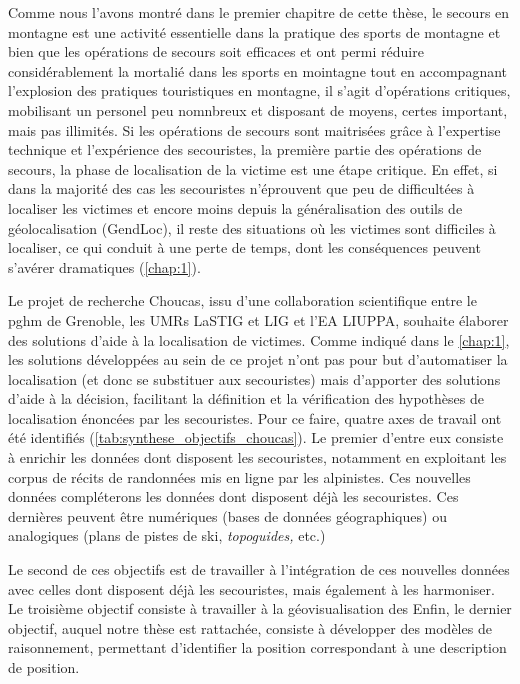 Comme nous l'avons montré dans le premier chapitre de cette thèse, le
secours en montagne est une activité essentielle dans la pratique des
sports de montagne et bien que les opérations de secours soit
efficaces et ont permi réduire considérablement la mortalié dans les
sports en mointagne tout en accompagnant l'explosion des pratiques
touristiques en montagne, il s'agit d'opérations critiques, mobilisant
un personel peu nomnbreux et disposant de moyens, certes important,
mais pas illimités. Si les opérations de secours sont maitrisées grâce
à l'expertise technique et l'expérience des secouristes,
%
la première partie des opérations de secours, \ie la phase de
localisation de la victime est une étape critique. En effet, si dans
la majorité des cas les secouristes n'éprouvent que peu de
difficultées à localiser les victimes et encore moins depuis la
généralisation des outils de géolocalisation (\eg GendLoc), il reste
des situations où les victimes sont difficiles à localiser, ce qui
conduit à une perte de temps, dont les conséquences peuvent s'avérer
dramatiques (\autoref{chap:1}).

Le projet de recherche Choucas, issu d'une collaboration scientifique
entre le \ac{pghm} de Grenoble, les UMRs LaSTIG et LIG et l'EA LIUPPA,
souhaite élaborer des solutions d'aide à la localisation de
victimes. Comme indiqué dans le \autoref{chap:1}, les solutions
développées au sein de ce projet n'ont pas pour but d'automatiser la
localisation (et donc se substituer aux secouristes) mais d'apporter
des solutions d'aide à la décision, facilitant la définition et la
vérification des hypothèses de localisation énoncées par les
secouristes. Pour ce faire, quatre axes de travail ont été identifiés
(\autoref{tab:synthese_objectifs_choucas}). Le premier d'entre eux
consiste à enrichir les données dont disposent les secouristes,
notamment en exploitant les corpus de récits de randonnées mis en
ligne par les alpinistes. Ces nouvelles données compléterons les
données dont disposent déjà les secouristes. Ces dernières peuvent
être numériques (\eg bases de données géographiques) ou analogiques
(\eg plans de pistes de ski, \emph{topoguides,} etc.)

Le second de ces objectifs est de travailler
à l'intégration de ces nouvelles données avec celles dont disposent
déjà les secouristes, mais également à les harmoniser. Le troisième
objectif consiste à travailler à la géovisualisation des Enfin, le
dernier objectif, auquel notre thèse est rattachée, consiste à
développer des modèles de raisonnement, permettant d'identifier la
position correspondant à une description de position.

